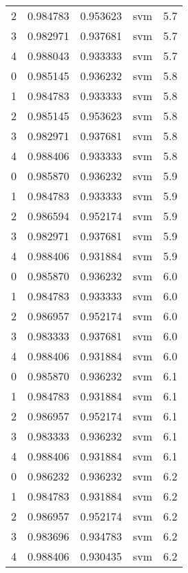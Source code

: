 \begin{tabular}{rrrlr}
     2 & 0.984783 & 0.953623 &      svm &        5.7 \\
     3 & 0.982971 & 0.937681 &      svm &        5.7 \\
     4 & 0.988043 & 0.933333 &      svm &        5.7 \\
     0 & 0.985145 & 0.936232 &      svm &        5.8 \\
     1 & 0.984783 & 0.933333 &      svm &        5.8 \\
     2 & 0.985145 & 0.953623 &      svm &        5.8 \\
     3 & 0.982971 & 0.937681 &      svm &        5.8 \\
     4 & 0.988406 & 0.933333 &      svm &        5.8 \\
     0 & 0.985870 & 0.936232 &      svm &        5.9 \\
     1 & 0.984783 & 0.933333 &      svm &        5.9 \\
     2 & 0.986594 & 0.952174 &      svm &        5.9 \\
     3 & 0.982971 & 0.937681 &      svm &        5.9 \\
     4 & 0.988406 & 0.931884 &      svm &        5.9 \\
     0 & 0.985870 & 0.936232 &      svm &        6.0 \\
     1 & 0.984783 & 0.933333 &      svm &        6.0 \\
     2 & 0.986957 & 0.952174 &      svm &        6.0 \\
     3 & 0.983333 & 0.937681 &      svm &        6.0 \\
     4 & 0.988406 & 0.931884 &      svm &        6.0 \\
     0 & 0.985870 & 0.936232 &      svm &        6.1 \\
     1 & 0.984783 & 0.931884 &      svm &        6.1 \\
     2 & 0.986957 & 0.952174 &      svm &        6.1 \\
     3 & 0.983333 & 0.936232 &      svm &        6.1 \\
     4 & 0.988406 & 0.931884 &      svm &        6.1 \\
     0 & 0.986232 & 0.936232 &      svm &        6.2 \\
     1 & 0.984783 & 0.931884 &      svm &        6.2 \\
     2 & 0.986957 & 0.952174 &      svm &        6.2 \\
     3 & 0.983696 & 0.934783 &      svm &        6.2 \\
     4 & 0.988406 & 0.930435 &      svm &        6.2 \\

\end{tabular}
